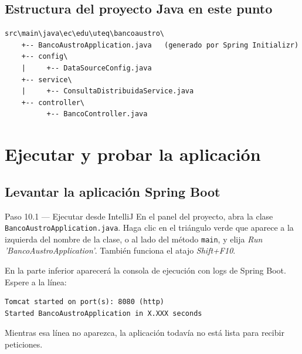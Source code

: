 \documentclass[11pt,a4paper]{article}
\begin{document}
\subsection{Estructura del proyecto Java en este punto}

\begin{lstlisting}[style=plainstyle,caption={C\'odigo del proyecto Spring Boot}]
src\main\java\ec\edu\uteq\bancoaustro\
    +-- BancoAustroApplication.java   (generado por Spring Initializr)
    +-- config\
    |     +-- DataSourceConfig.java
    +-- service\
    |     +-- ConsultaDistribuidaService.java
    +-- controller\
          +-- BancoController.java
\end{lstlisting}

\clearpage
\section{Ejecutar y probar la aplicaci\'on}

\subsection{Levantar la aplicaci\'on Spring Boot}

\begin{pasobox}{Paso 10.1 --- Ejecutar desde IntelliJ}
En el panel del proyecto, abra la clase \texttt{BancoAustroApplication.java}. Haga clic en el tri\'angulo verde que aparece a la izquierda del nombre de la clase, o al lado del m\'etodo \texttt{main}, y elija \emph{Run 'BancoAustroApplication'}. Tambi\'en funciona el atajo \emph{Shift+F10}.

En la parte inferior aparecer\'a la consola de ejecuci\'on con logs de Spring Boot. Espere a la l\'inea:

\begin{lstlisting}[style=plainstyle]
Tomcat started on port(s): 8080 (http)
Started BancoAustroApplication in X.XXX seconds
\end{lstlisting}

Mientras esa l\'inea no aparezca, la aplicaci\'on todav\'ia no est\'a lista para recibir peticiones.
\end{pasobox}
\end{document}
